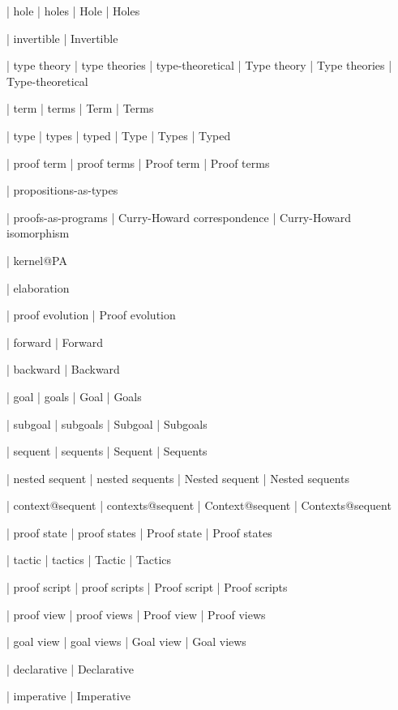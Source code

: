  | hole
 | holes
 | Hole
 | Holes

 | invertible
 | Invertible

 | type theory
 | type theories
 | type-theoretical
 | Type theory
 | Type theories
 | Type-theoretical

 | term
 | terms
 | Term
 | Terms

 | type
 | types
 | typed
 | Type
 | Types
 | Typed

 | proof term
 | proof terms
 | Proof term
 | Proof terms

 | propositions-as-types

 | proofs-as-programs
 | Curry-Howard correspondence
 | Curry-Howard isomorphism

 | kernel@PA

 | elaboration

 | proof evolution
 | Proof evolution

 | forward
 | Forward

 | backward
 | Backward
 
 | goal
 | goals
 | Goal
 | Goals

 | subgoal
 | subgoals
 | Subgoal
 | Subgoals

 | sequent
 | sequents
 | Sequent
 | Sequents

 | nested sequent
 | nested sequents
 | Nested sequent
 | Nested sequents

 | context@sequent
 | contexts@sequent
 | Context@sequent
 | Contexts@sequent

 | proof state
 | proof states
 | Proof state
 | Proof states

 | tactic
 | tactics
 | Tactic
 | Tactics

 | proof script
 | proof scripts
 | Proof script
 | Proof scripts

 | proof view
 | proof views
 | Proof view
 | Proof views

 | goal view
 | goal views
 | Goal view
 | Goal views

 | declarative
 | Declarative

 | imperative
 | Imperative

